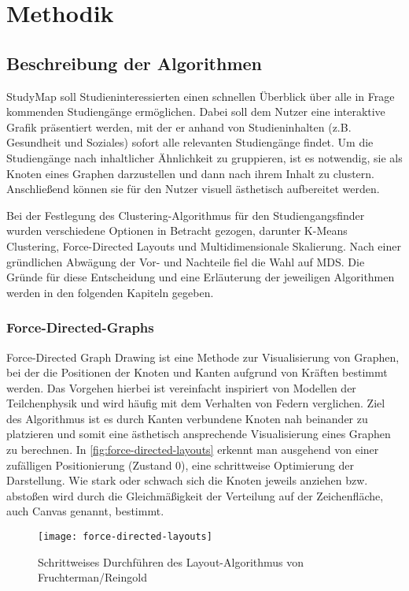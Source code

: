 \section{Methodik}\label{sec:methodik}
\subsection{Beschreibung der Algorithmen}
StudyMap soll Studieninteressierten einen schnellen Überblick über alle in Frage kommenden Studiengänge ermöglichen.  Dabei soll dem Nutzer eine interaktive Grafik präsentiert werden, mit der er anhand von Studieninhalten (z.B. \glqq Gesundheit und Soziales\grqq{}) sofort alle relevanten Studiengänge findet. Um die Studiengänge nach inhaltlicher Ähnlichkeit zu gruppieren, ist es notwendig, sie als Knoten eines Graphen darzustellen und dann nach ihrem Inhalt zu clustern. Anschließend können sie für den Nutzer visuell ästhetisch aufbereitet werden.

Bei der Festlegung des Clustering-Algorithmus für den Studiengangsfinder wurden
verschiedene Optionen in Betracht gezogen, darunter K-Means Clustering,
Force-Directed Layouts und Multidimensionale Skalierung. Nach einer
gründlichen Abwägung der Vor- und Nachteile fiel die Wahl auf MDS. Die Gründe
für diese Entscheidung und eine Erläuterung der jeweiligen Algorithmen werden in
den folgenden Kapiteln gegeben.

\subsubsection{Force-Directed-Graphs}
Force-Directed Graph Drawing ist eine Methode zur Visualisierung von Graphen, bei der die Positionen der Knoten und Kanten aufgrund von Kräften bestimmt werden. Das Vorgehen hierbei ist vereinfacht inspiriert von Modellen der Teilchenphysik und wird häufig mit dem Verhalten von Federn verglichen. Ziel des Algorithmus ist es durch Kanten verbundene Knoten nah beinander zu platzieren und somit eine ästhetisch ansprechende Visualisierung eines Graphen zu berechnen. In \autoref{fig:force-directed-layouts} erkennt man ausgehend von einer zufälligen Positionierung (Zustand 0), eine schrittweise Optimierung der Darstellung. Wie stark oder schwach sich die Knoten jeweils \glqq anziehen\grqq{} bzw. \glqq abstoßen\grqq{} wird durch die Gleichmäßigkeit der Verteilung auf der Zeichenfläche, auch Canvas genannt, bestimmt. \parencite{schonfeld_fruchtermanreingold_2019}

\begin{figure}[H]
    \centering
    \texttt{[image: force-directed-layouts]}
    \caption{Schrittweises Durchführen des Layout-Algorithmus von Fruchterman/Reingold}
    \label{fig:force-directed-layouts}
\end{figure}

